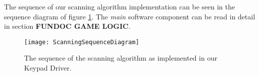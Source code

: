 The sequence of our scanning algorithm implementation can be seen in the sequence diagram of figure \ref{ScanningAlgorithmSequence}. The \textit{main} software component can be read in detail in section \textbf{FUNDOC GAME LOGIC}.

\begin{figure}[H]
	\texttt{[image: ScanningSequenceDiagram]}
	\centering
	\caption{The sequence of the scanning algorithm as implemented in our Keypad Driver.}
	\label{ScanningAlgorithmSequence}
\end{figure}

